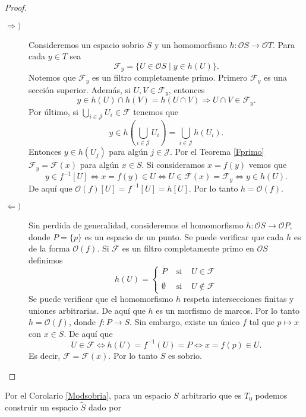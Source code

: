\documentclass{comunicaciones}
\begin{document}
\begin{proof}
    \begin{description}
        \item[$\Rightarrow )$] Consideremos un espacio sobrio $S$ y un homomorfismo $h\colon \mathcal{O}S\to \mathcal{O}T$. Para cada $y\in T$ sea 
        \[
        \mathcal{F}_y=\{U\in \mathcal{O}S\mid y\in h(U)\}.
        \]
        Notemos que $\mathcal{F}_y$ es un filtro completamente primo. Primero $\mathcal{F}_y$ es una sección superior. Además, si $U, V\in \mathcal{F}_y$, entonces
        \[
        y\in h(U)\cap h(V)=h(U\cap V)\Rightarrow U\cap V\in \mathcal{F}_y.
        \]
        Por último, si $\bigcup_{i\in\mathcal{J}}U_i\in\mathcal{F}$ tenemos que 
        \[
        y\in h(\bigcup_{i\in \mathcal{J}}U_i)=\bigcup_{i\in\mathcal{J}}h(U_i).
        \]
        Entonces $y\in h(U_j)$ para algún $j\in \mathcal{J}$. Por el Teorema \ref{Fprimo} $\mathcal{F}_y=\mathcal{F}(x)$ para algún $x\in S$. Si consideramos $x=f(y)$ vemos que 
        \[
        y\in f^{-1}[U]\Leftrightarrow x=f(y)\in U\Leftrightarrow U\in \mathcal{F}(x)=\mathcal{F}_y\Leftrightarrow y\in h(U).
        \]
        De aquí que $\mathcal{O}(f)[U]=f^{-1}[U]=h[U]$. Por lo tanto $h=\mathcal{O}(f)$.
        \item[$\Leftarrow )$] Sin perdida de generalidad, consideremos el homomorfismo $h\colon \mathcal{O}S\to \mathcal{O}P$, donde $P=\{p\}$ es un espacio de un punto. Se puede verificar que cada $h$ es de la forma $\mathcal{O}(f)$. Si 
        $\mathcal{F}$ es un filtro completamente primo en $\mathcal{O}S$ definimos 
        \[
        h(U)= \left\{ \begin{array}{lcc} P & \mbox{ si } & U\in \mathcal{F} \\ \\ \emptyset & \mbox{ si } & U\notin \mathcal{F} \end{array} \right.
        \]
        Se puede verificar que el homomorfismo $h$ respeta intersecciones finitas y uniones arbitrarias. De aquí que $h$ es un morfismo de marcos. Por lo tanto $h=\mathcal{O}(f)$, donde $f\colon P\to S$. Sin embargo, existe un único $f$ tal que $p\mapsto x$ con $x\in S$. De aquí que
        \[
        U\in \mathcal{F}\Leftrightarrow h(U)=f^{-1}(U)=P\Leftrightarrow x=f(p)\in U.
        \]
        Es decir, $\mathcal{F}=\mathcal{F}(x)$. Por lo tanto $S$ es sobrio.
    \end{description}
\end{proof}

Por el Corolario \ref{Modsobria}, para un espacio $S$ arbitrario que es $T_0$ podemos construir un espacio $\tilde{S}$ dado por 
\end{document}
